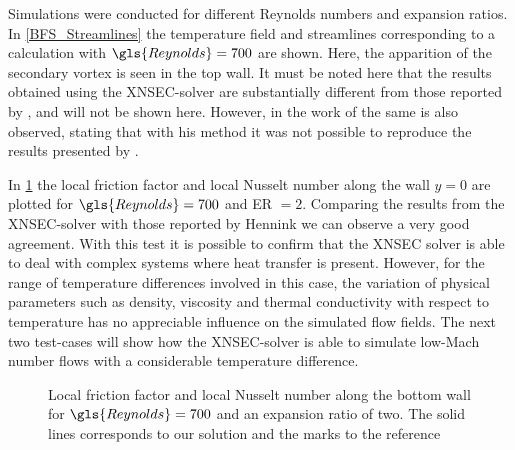 Simulations were conducted for different Reynolds numbers and expansion ratios. In \cref{BFS_Streamlines} the temperature field and streamlines corresponding to a calculation with $\gls{Reynolds} = 700$ are shown. Here, the apparition of the secondary vortex is seen in the top wall. It must be noted here that the results obtained using the XNSEC-solver are substantially different from those reported by \cite{xieFluidFlowHeat2016}, and will not be shown here. However, in the work of \cite{henninkLowMachNumberFlow2022} the same is also observed, stating that with his method it was not possible to reproduce the results presented by \cite{xieFluidFlowHeat2016}. 

In \cref{fig:fd_Nu_plot} the local friction factor and local Nusselt number along the wall $y = 0$ are plotted for $\gls{Reynolds} = 700$ and ER $= 2$. Comparing the results from the XNSEC-solver with those reported by Hennink we can observe a very good agreement.
With this test it is possible to confirm that the XNSEC solver is able to deal with complex systems where heat transfer is present. However, for the range of temperature differences involved in this case, the variation of physical parameters such as density, viscosity and thermal conductivity with respect to temperature has no appreciable influence on the simulated flow fields. The next two test-cases will show how the XNSEC-solver is able to simulate low-Mach number flows with a considerable temperature difference.
\begin{figure}[tb]
	\caption{Local friction factor and local Nusselt number along the bottom wall for $\gls{Reynolds} = 700$ and an expansion ratio of two. The solid lines corresponds to our solution and the marks to the reference \citep{henninkLowMachNumberFlow2022}}
	\label{fig:fd_Nu_plot}
\end{figure}
\FloatBarrier